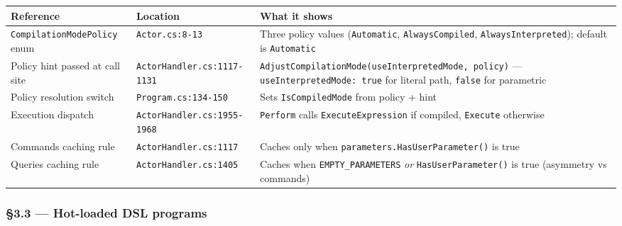 \documentclass[
]{article}
\newcounter{none} %
\let\origtexttt\texttt%
\renewcommand{\texttt}[1]{\origtexttt{\seqsplit{#1}}}%
\let\texttt\origtexttt%
\begin{document}
{\def\LTcaptype{none} %
\begin{longtable}[]{@{}
  >{\raggedright\arraybackslash}p{}
  >{\raggedright\arraybackslash}p{}
  >{\raggedright\arraybackslash}p{}@{}}
\toprule\noalign{}
\begin{minipage}[b]{\linewidth}\raggedright
Reference
\end{minipage} & \begin{minipage}[b]{\linewidth}\raggedright
Location
\end{minipage} & \begin{minipage}[b]{\linewidth}\raggedright
What it shows
\end{minipage} \\
\midrule\noalign{}
\endhead
\bottomrule\noalign{}
\endlastfoot
\texttt{CompilationModePolicy} enum & \texttt{Actor.cs:8-13} & Three
policy values (\texttt{Automatic}, \texttt{AlwaysCompiled},
\texttt{AlwaysInterpreted}); default is \texttt{Automatic} \\
Policy hint passed at call site & \texttt{ActorHandler.cs:1117-1131} &
\texttt{AdjustCompilationMode(useInterpretedMode,\ policy)} ---
\texttt{useInterpretedMode:\ true} for literal path, \texttt{false} for
parametric \\
Policy resolution switch & \texttt{Program.cs:134-150} & Sets
\texttt{IsCompiledMode} from policy + hint \\
Execution dispatch & \texttt{ActorHandler.cs:1955-1968} &
\texttt{Perform} calls \texttt{ExecuteExpression} if compiled,
\texttt{Execute} otherwise \\
Commands caching rule & \texttt{ActorHandler.cs:1117} & Caches only when
\texttt{parameters.HasUserParameter()} is true \\
Queries caching rule & \texttt{ActorHandler.cs:1405} & Caches when
\texttt{EMPTY\_PARAMETERS} \emph{or} \texttt{HasUserParameter()} is true
(asymmetry vs commands) \\
\end{longtable}
}

\subsubsection{§3.3 --- Hot-loaded DSL
programs}\label{hot-loaded-dsl-programs}
\end{document}
